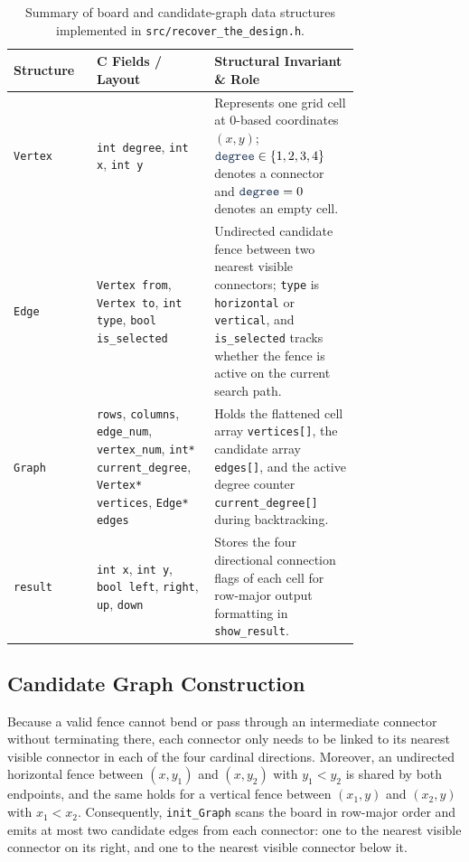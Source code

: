 \documentclass[10pt, a4paper]{article}
\newcommand{\code}[1]{\texttt{\color{primary!90!black}#1}}
\begin{document}
\begin{table}[H]
\centering
\caption{Summary of board and candidate-graph data structures implemented in \code{src/recover\_the\_design.h}.}
\label{tab:structures}
\begin{tabular}{@{}l>{\raggedright\arraybackslash}p{0.34\linewidth}>{\raggedright\arraybackslash}p{0.42\linewidth}@{}}
\toprule
\textbf{\color{primary}Structure} & \textbf{\color{primary}C Fields / Layout} & \textbf{\color{primary}Structural Invariant \& Role} \\
\midrule
\code{Vertex} & \code{int degree}, \code{int x}, \code{int y} & Represents one grid cell at 0-based coordinates $(x,y)$; $\code{degree} \in \{1,2,3,4\}$ denotes a connector and $\code{degree} = 0$ denotes an empty cell. \\
\code{Edge} & \code{Vertex from}, \code{Vertex to}, \code{int type}, \code{bool is\_selected} & Undirected candidate fence between two nearest visible connectors; \code{type} is \code{horizontal} or \code{vertical}, and \code{is\_selected} tracks whether the fence is active on the current search path. \\
\code{Graph} & \code{rows}, \code{columns}, \code{edge\_num}, \code{vertex\_num}, \code{int* current\_degree}, \code{Vertex* vertices}, \code{Edge* edges} & Holds the flattened cell array \code{vertices[]}, the candidate array \code{edges[]}, and the active degree counter \code{current\_degree[]} during backtracking. \\
\code{result} & \code{int x}, \code{int y}, \code{bool left}, \code{right}, \code{up}, \code{down} & Stores the four directional connection flags of each cell for row-major output formatting in \code{show\_result}. \\
\bottomrule
\end{tabular}
\end{table}

\subsection{Candidate Graph Construction}
Because a valid fence cannot bend or pass through an intermediate connector without terminating there, each connector only needs to be linked to its nearest visible connector in each of the four cardinal directions. Moreover, an undirected horizontal fence between $(x, y_1)$ and $(x, y_2)$ with $y_1 < y_2$ is shared by both endpoints, and the same holds for a vertical fence between $(x_1, y)$ and $(x_2, y)$ with $x_1 < x_2$. Consequently, \code{init\_Graph} scans the board in row-major order and emits at most two candidate edges from each connector: one to the nearest visible connector on its right, and one to the nearest visible connector below it.
\end{document}
